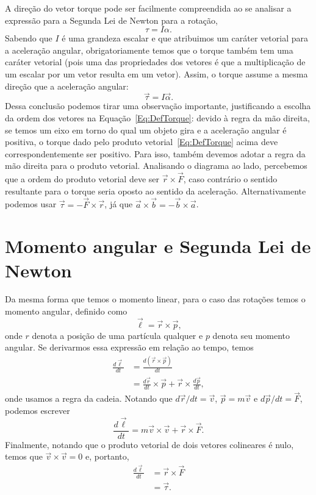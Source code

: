 A direção do vetor torque pode ser facilmente compreendida ao se analisar a expressão para a Segunda Lei de Newton para a rotação,
\begin{equation}
  \tau = I \alpha.
\end{equation}
%
Sabendo que $I$ é uma grandeza escalar e que atribuimos um caráter vetorial para a aceleração angular, obrigatoriamente temos que o torque também tem uma caráter vetorial (pois uma das propriedades dos vetores é que a multiplicação de um escalar por um vetor resulta em um vetor). Assim, o torque assume a mesma direção que a aceleração angular:
\begin{equation}
  \vec{\tau} = I\vec{\alpha}.
\end{equation}
%
Dessa conclusão podemos tirar uma observação importante, justificando a escolha da ordem dos vetores na Equação~\eqref{Eq:DefTorque}: devido à regra da mão direita, se temos um eixo em torno do qual um objeto gira e a aceleração angular é positiva, o torque dado pelo produto vetorial~\eqref{Eq:DefTorque} acima deve correspondentemente ser positivo. Para isso, também devemos adotar a regra da mão direita para o produto vetorial. Analisando o diagrama ao lado, percebemos que a ordem do produto vetorial deve ser $\vec{r}\times\vec{F}$, caso contrário o sentido resultante para o torque seria oposto ao sentido da aceleração. Alternativamente podemos usar $\vec{\tau} = -\vec{F}\times\vec{r}$, já que $\vec{a}\times\vec{b} = - \vec{b}\times\vec{a}$.

\section{Momento angular e Segunda Lei de Newton}

Da mesma forma que temos o momento linear, para o caso das rotações temos o momento angular, definido como
\begin{equation}\label{Eq:DefMomAngular}
  \vec{\ell} = \vec{r}\times\vec{p},
\end{equation}
%
onde $r$ denota a posição de uma partícula qualquer e $p$ denota seu momento angular. Se derivarmos essa expressão em relação ao tempo, temos
\begin{align}
  \frac{d\vec{\ell}}{dt} &= \frac{d(\vec{r}\times\vec{p})}{dt} \\
  &= \frac{d\vec{r}}{dt}\times\vec{p} + \vec{r}\times\frac{d\vec{p}}{dt},
\end{align}
%
onde usamos a regra da cadeia. Notando que $d\vec{r}/dt = \vec{v}$, $\vec{p} = m \vec{v}$ e $d\vec{p}/dt = \vec{F}$, podemos escrever
\begin{equation}
  \frac{d\vec{\ell}}{dt} = m\vec{v}\times\vec{v} + \vec{r} \times \vec{F}.
\end{equation}
%
Finalmente, notando que o produto vetorial de dois vetores colineares é nulo, temos que $\vec{v}\times\vec{v} = 0$ e, portanto,
\begin{align}
  \frac{d\vec{\ell}}{dt} &= \vec{r} \times \vec{F} \\
  &= \vec{\tau}.
\end{align}

